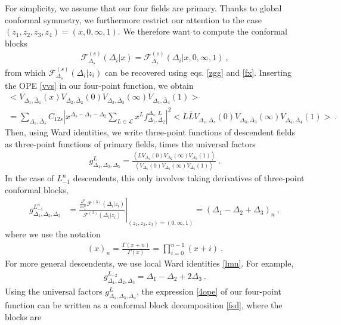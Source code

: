 \documentclass[12pt, a4paper, notitlepage, twoside]{report}
\numberwithin{equation}{section}
\theoremstyle{break}
\begin{document}
For simplicity, we assume that our four fields are primary.
Thanks to global conformal symmetry, we furthermore restrict our attention to the case $(z_1,z_2,z_3,z_4)=(x,0,\infty, 1)$. 
We therefore want to compute the conformal blocks 
\begin{align}
 \mathcal{F}^{(s)}_{\Delta_s}(\Delta_i|x)=\mathcal{F}^{(s)}_{\Delta_s}(\Delta_i|x,0,\infty,1)\ ,
\end{align}
from which $\mathcal{F}^{(s)}_{\Delta_s}(\Delta_i|z_i)$ can be recovered  using eqs. \eqref{zgg} and \eqref{fx}.
Inserting the OPE \eqref{vvs} in our four-point function, we obtain
\begin{multline}
 \Big< V_{\Delta_1,\bar\Delta_1}(x) V_{\Delta_2,\bar\Delta_2}(0)V_{\Delta_3,\bar\Delta_3}(\infty)V_{\Delta_4,\bar\Delta_4}(1)\Big>
 \\
 = 
 \sum_{\Delta_s,\bar\Delta_s} C_{12s} 
 \left| x^{\Delta_s-\Delta_1-\Delta_2}\sum_{L\in\mathcal{L}} x^Lf^{\Delta_s,L}_{\Delta_1,\Delta_2} \right|^2
 \Big< L\bar L V_{\Delta_s,\bar\Delta_s}(0) V_{\Delta_3,\bar\Delta_3}(\infty) V_{\Delta_4,\bar\Delta_4}(1) \Big>\ .
 \label{4ope}
\end{multline}
Then, using Ward identities, we write three-point functions of descendent fields as three-point functions of primary fields, times the universal factors
\begin{align}
g^{L}_{\Delta_1,\Delta_2,\Delta_3} = 
 \frac{ \left< L V_{\Delta_1}(0)V_{\Delta_2}(\infty)V_{\Delta_3}(1)\right> }{  \left<  V_{\Delta_1}(0)V_{\Delta_2}(\infty)V_{\Delta_3}(1)\right>}\ .
 \label{glvv}
\end{align}
In the case of $L_{-1}^n$ descendents, this only involves taking derivatives of three-point conformal blocks, 
\begin{align}
 g^{L_{-1}^n}_{\Delta_1,\Delta_2,\Delta_3} & =\left. \frac{\frac{\partial^n}{\partial z_1^n} \mathcal{F}^{(3)}(\Delta_i|z_i)}{\mathcal{F}^{(3)}(\Delta_i|z_i)}\right|_{(z_1,z_2,z_3)=(0,\infty,1)} =(\Delta_1-\Delta_2+\Delta_3)_n \ ,
 \label{gln}
\end{align}
where we use the notation
\begin{align}
 (x)_n = \frac{\Gamma(x+n)}{\Gamma(x)} = \prod_{i=0}^{n-1}(x+i)\ .
\label{xn}
\end{align}
For more general descendents, we use local Ward identities \eqref{lmn}. For example,
\begin{align}
 g^{L_{-2}}_{\Delta_1,\Delta_2,\Delta_3}
 = \Delta_1-\Delta_2+2\Delta_3\ .
 \label{glt}
\end{align}
Using the universal factors $g^L_{\Delta_s,\Delta_3,\Delta_4}$, the expression \eqref{4ope} of our four-point function can be written as a conformal block decomposition \eqref{fsd}, where the blocks are 
\end{document}
